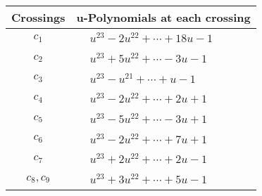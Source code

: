 \documentclass[1p]{elsarticle_modified}
\theoremstyle{definition}
\begin{document}
\begin{tabular}{m{50pt}|m{274pt}}
Crossings & \hspace{64pt}u-Polynomials at each crossing \\
\hline $$\begin{aligned}c_{1}\end{aligned}$$&$\begin{aligned}
&u^{23}-2 u^{22}+\cdots+18 u-1
\end{aligned}$\\
\hline $$\begin{aligned}c_{2}\end{aligned}$$&$\begin{aligned}
&u^{23}+5 u^{22}+\cdots-3 u-1
\end{aligned}$\\
\hline $$\begin{aligned}c_{3}\end{aligned}$$&$\begin{aligned}
&u^{23}- u^{21}+\cdots+u-1
\end{aligned}$\\
\hline $$\begin{aligned}c_{4}\end{aligned}$$&$\begin{aligned}
&u^{23}-2 u^{22}+\cdots+2 u+1
\end{aligned}$\\
\hline $$\begin{aligned}c_{5}\end{aligned}$$&$\begin{aligned}
&u^{23}-5 u^{22}+\cdots-3 u+1
\end{aligned}$\\
\hline $$\begin{aligned}c_{6}\end{aligned}$$&$\begin{aligned}
&u^{23}-2 u^{22}+\cdots+7 u+1
\end{aligned}$\\
\hline $$\begin{aligned}c_{7}\end{aligned}$$&$\begin{aligned}
&u^{23}+2 u^{22}+\cdots+2 u-1
\end{aligned}$\\
\hline $$\begin{aligned}c_{8},c_{9}\end{aligned}$$&$\begin{aligned}
&u^{23}+3 u^{22}+\cdots+5 u-1
\end{aligned}$\\

\end{tabular}
\end{document}

